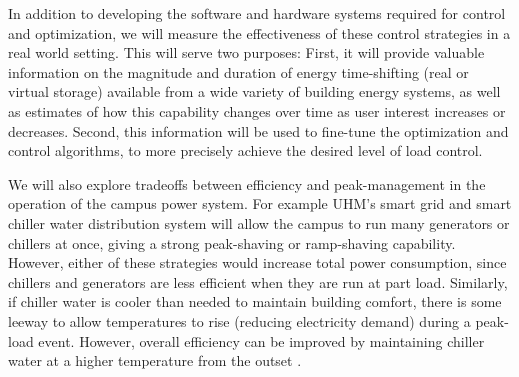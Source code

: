 In addition to developing the software and hardware systems required 
for control and optimization, we will measure the effectiveness of these 
control strategies in a real world setting. This will serve two purposes: 
First, it will provide valuable
information on the magnitude and duration of energy time-shifting 
(real or virtual storage) available 
from a wide variety of building energy systems, as well as estimates of how
this capability changes over time as user interest increases or decreases. 
Second, this information will be used to fine-tune the
optimization and control algorithms, to more precisely achieve the desired
level of load control.

We will also explore tradeoffs between efficiency and peak-management in the operation
of the campus power system. For example UHM's
smart grid and smart chiller water distribution system will allow the campus to
run many generators or chillers at once, giving a strong peak-shaving or
ramp-shaving capability. However, either of these strategies would increase
total power consumption, since chillers and generators are less efficient
when they are run at part load. Similarly, if chiller water is cooler than needed
to maintain building comfort, there is some leeway to allow temperatures to rise
(reducing electricity demand) during a peak-load event. However, overall 
efficiency can be improved by maintaining chiller water at a higher temperature
from the outset \cite{Motegi07}.

